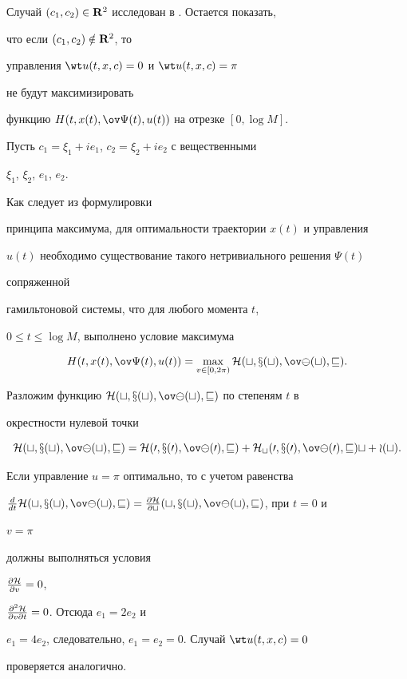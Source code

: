 \begin{pf}


Случай $(c_1,c_2)\in\bold R^2$ исследован в \cite{3}. Остается показать,


что если $(c_1,c_2)\notin\bold R^2$, то


управления $\wt u(t,x,c)=0$ и $\wt u(t,x,c)=\pi$


не будут максимизировать


функцию $H(t,x(t),\ov\Psi(t),u(t))$ на отрезке $[0,\log M]$.


Пусть $c_1=\xi_1+i e_1$, $c_2=\xi_2+i e_2$ с вещественными


$\xi_1$, $\xi_2$, $e_1$, $e_2$.


Как следует из формулировки


принципа максимума, для оптимальности траектории $x(t)$ и управления


$u(t)$ необходимо существование такого нетривиального решения $\Psi(t)$


сопряженной


гамильтоновой системы, что для любого момента $t$,


$0\le t\le\log M$, выполнено условие максимума


$$


H(t,x(t),\ov\Psi(t),u(t))=\max_{v\in[0,2\pi)}


\cal H(t,x(t),\ov\Psi(t),v).


$$


Разложим функцию $\cal H(t,x(t),\ov\Psi(t),v)$ по степеням $t$ в


окрестности нулевой точки


$$


\cal H(t,x(t),\ov\Psi(t),v)=\cal H(0,x(0),\ov\Psi(0),v)+


\cal H_t(0,x(0),\ov\Psi(0),v)t+o(t).


$$


Если управление $u=\pi$ оптимально, то с учетом равенства


$\frac{d}{dt}\cal H(t,x(t),\ov\Psi(t),v)=


\frac{\partial\cal H}{\partial t}(t,x(t),\ov\Psi(t),v)$, при $t=0$ и


$v=\pi$


должны выполняться условия


$\frac{\partial\cal H}{\partial v}=0$,


$\frac{\partial^2\cal H}{\partial v\partial t}=0$. Отсюда $e_1=2e_2$ и


$e_1=4e_2$, следовательно, $e_1=e_2=0$. Случай $\wt u(t,x,c)=0$


проверяется аналогично.


\end{pf}





